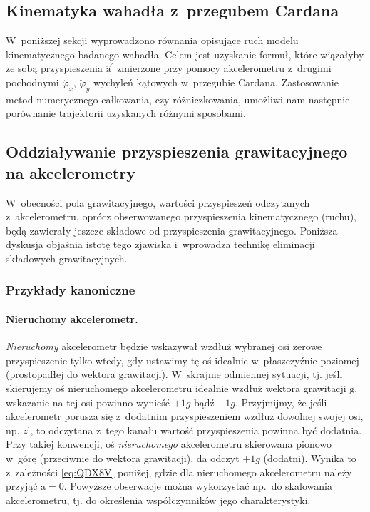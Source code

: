 \documentclass[paper=a4,DIV=12]{tmmlab}
\newcommand{\brm}[1]{\bm{\mathrm{#1}}}
\begin{document}
\begin{appendices}
\section{Kinematyka wahadła z~przegubem Cardana}
\label{sec:4XR18}

W~poniższej sekcji wyprowadzono równania opisujące ruch modelu kinematycznego
badanego wahadła. Celem jest uzyskanie formuł, które wiązałyby ze sobą
przyspieszenia $\hat{\brm{a}}^{\prime}$ zmierzone przy pomocy akcelerometru
z~drugimi pochodnymi $\ddot{\varphi}_x$, $\ddot{\varphi}_y$ wychyleń kątowych
w~przegubie Cardana. Zastosowanie metod numerycznego całkowania, czy
różniczkowania, umożliwi nam następnie porównanie trajektorii uzyskanych
różnymi sposobami.

\subsection{Oddziaływanie przyspieszenia grawitacyjnego na akcelerometry}
\label{sec:LIIHL}

W~obecności pola grawitacyjnego, wartości przyspieszeń odczytanych
z~akcelerometru, oprócz obserwowanego przyspieszenia kinematycznego (ruchu),
będą zawierały jeszcze składowe od przyspieszenia grawitacyjnego. Poniższa
dyskusja objaśnia istotę tego zjawiska i~wprowadza technikę eliminacji
składowych grawitacyjnych.

\subsubsection{Przykłady kanoniczne}
\label{sec:YFBVX}

\paragraph{Nieruchomy akcelerometr.}
{\em Nieruchomy} akcelerometr będzie wskazywał wzdłuż wybranej osi  zerowe
przyspieszenie tylko wtedy, gdy ustawimy tę oś idealnie w~płaszczyźnie
poziomej (prostopadłej do wektora grawitacji). W~skrajnie odmiennej sytuacji,
tj. jeśli skierujemy oś nieruchomego akcelerometru idealnie wzdłuż wektora
grawitacji $\brm{g}$, wskazanie na tej osi powinno wynieść $+1g$ bądź $-1g$.
Przyjmijmy, że jeśli akcelerometr porusza się z~dodatnim przyspieszeniem wzdłuż
dowolnej swojej osi, np. $z^{\prime}$, to odczytana z~tego kanału wartość
przyspieszenia powinna być dodatnia. Przy takiej konwencji, oś {\em
nieruchomego} akcelerometru skierowana pionowo w~górę (przeciwnie do wektora
grawitacji), da odczyt $+1g$ (dodatni). Wynika to z~zależności
\eqref{eq:QDX8V} poniżej, gdzie dla nieruchomego akcelerometru należy
przyjąć $\brm{a} = \brm{0}$. Powyższe obserwacje można wykorzystać np.~do
skalowania akcelerometru, tj. do określenia współczynników jego
charakterystyki.


\end{appendices}
\end{document}
